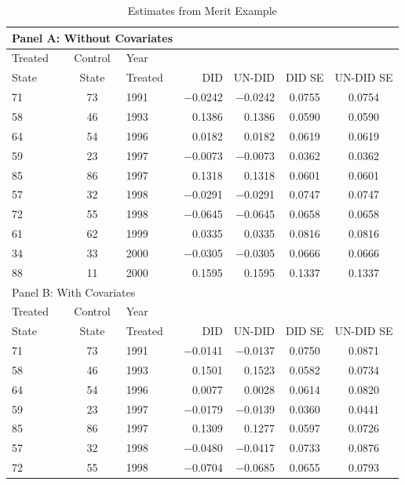 \begin{table}
\renewcommand{\arraystretch}{1.4}
\caption{Estimates from Merit Example}
\begin{tabular}{lclrrcc}
 \multicolumn{3}{l}{Panel A: Without Covariates}   & & & &        \\
\hline
Treated & Control & Year &     &    &  &  \\
State & State & Treated & DID    & UN-DID   & DID SE & UN-DID SE \\
\hline
71      & 73      & 1991 & $-0$.0242 & $-0$.0242 & 0.0755  & 0.0754  \\
58      & 46      & 1993 & 0.1386  & 0.1386  & 0.0590  & 0.0590  \\
64      & 54      & 1996 & 0.0182  & 0.0182  & 0.0619  & 0.0619  \\
59      & 23      & 1997 & $-0$.0073 & $-0$.0073 & 0.0362  & 0.0362  \\
85      & 86      & 1997 & 0.1318  & 0.1318  & 0.0601  & 0.0601  \\
57      & 32      & 1998 & $-0$.0291 & $-0$.0291 & 0.0747  & 0.0747  \\
72      & 55      & 1998 & $-0$.0645 & $-0$.0645 & 0.0658  & 0.0658  \\
61      & 62      & 1999 & 0.0335  & 0.0335  & 0.0816  & 0.0816  \\
34      & 33      & 2000 & $-0$.0305 & $-0$.0305 & 0.0666  & 0.0666  \\
88      & 11      & 2000 & 0.1595  & 0.1595  & 0.1337  & 0.1337  \\
\hline
 \multicolumn{3}{l}{Panel B: With Covariates}   & & & &        \\
 \hline
 Treated & Control & Year &     &    &  &  \\
State & State & Treated & DID    & UN-DID   & DID SE & UN-DID SE \\
\hline
71      & 73      & 1991 & $-0$.0141 & $-0$.0137 & 0.0750  & 0.0871  \\
58      & 46      & 1993 & 0.1501  & 0.1523  & 0.0582  & 0.0734  \\
64      & 54      & 1996 & 0.0077  & 0.0028  & 0.0614  & 0.0820  \\
59      & 23      & 1997 & $-0$.0179 & $-0$.0139 & 0.0360  & 0.0441  \\
85      & 86      & 1997 & 0.1309  & 0.1277  & 0.0597  & 0.0726  \\
57      & 32      & 1998 & $-0$.0480 & $-0$.0417 & 0.0733  & 0.0876  \\
72      & 55      & 1998 & $-0$.0704 & $-0$.0685 & 0.0655  & 0.0793  \\

\end{tabular}
\end{table}
